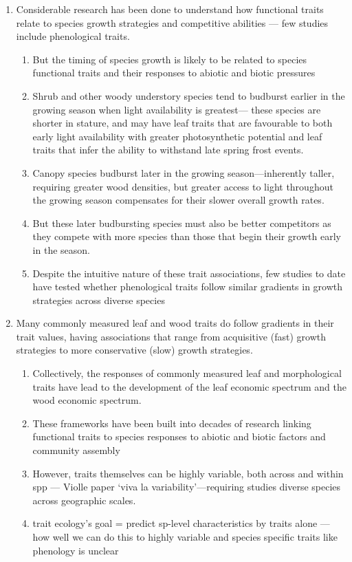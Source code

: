 \documentclass{article}
\begin{document}
\begin{enumerate}
\item Considerable research has been done to understand how functional traits relate to species growth strategies and competitive abilities — few studies include phenological traits.
\begin{enumerate}
\item But the timing of species growth is likely to be related to species functional traits and their responses to abiotic and biotic pressures
\item Shrub and other woody understory species tend to budburst earlier in the growing season when light availability is greatest--- these species are shorter in stature, and may have leaf traits that are favourable to both early light availability with greater photosynthetic potential and leaf traits that infer the ability to withstand late spring frost events.
\item Canopy species budburst later in the growing season---inherently taller, requiring greater wood densities, but greater access to light  throughout the growing season compensates for their slower overall growth rates.
\item But these later budbursting species must also be better competitors as they compete with more species than those that begin their growth early in the season.
\item Despite the intuitive nature of these trait associations, few studies to date have tested whether phenological traits follow similar gradients in growth strategies across diverse species
\end{enumerate}

 \item Many commonly measured leaf and wood traits do follow gradients in their trait values, having associations that range from acquisitive (fast) growth strategies to more conservative (slow) growth strategies.
\begin{enumerate}
\item Collectively, the responses of commonly measured leaf and morphological traits have lead to the development of the leaf economic spectrum and the wood economic spectrum. 
\item These frameworks have been built into decades of research linking functional traits to species responses to abiotic and biotic factors and community assembly
\item However, traits themselves can be highly variable, both across and within spp --- Violle paper ‘viva la variability’---requiring studies diverse species across geographic scales. 
\item trait ecology’s goal = predict sp-level characteristics by traits alone — how well we can do this to highly variable and species specific traits like phenology is unclear
\end{enumerate}


\end{enumerate}
\end{document}
